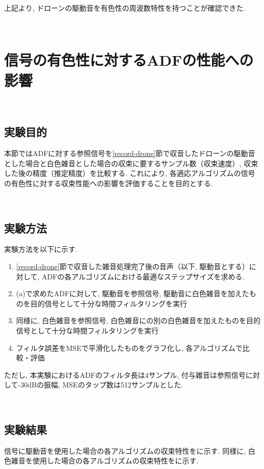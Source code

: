 上記より, ドローンの駆動音を有色性の周波数特性を持つことが確認できた. 

\
\section{信号の有色性に対するADFの性能への影響}\label{adf-color-effect}

\
\subsection{実験目的}\label{purpose-color}

本節ではADFに対する参照信号を\ref{record-drone}節で収音したドローンの駆動音とした場合と白色雑音とした場合の収束に要するサンプル数（収束速度）, 収束した後の精度（推定精度）を比較する. 
これにより, 各適応アルゴリズムの信号の有色性に対する収束性能への影響を評価することを目的とする. 

\
\subsection{実験方法}\label{instruction-color}

実験方法を以下に示す. 

\begin{enumerate}
\renewcommand{\labelenumi}{(\arabic{enumi})}
\item
  \ref{record-drone}節で収音した雑音処理完了後の音声（以下, 駆動音とする）に対して, ADFの各アルゴリズムにおける最適なステップサイズを求める. 
\item
  (a)で求めたADFに対して, 駆動音を参照信号, 駆動音に白色雑音を加えたものを目的信号として十分な時間フィルタリングを実行
\item
  同様に, 白色雑音を参照信号, 白色雑音にの別の白色雑音を加えたものを目的信号として十分な時間フィルタリングを実行
\item
  フィルタ誤差をMSEで平滑化したものをグラフ化し, 各アルゴリズムで比較・評価
\end{enumerate}

ただし, 本実験におけるADFのフィルタ長は4サンプル, 付与雑音は参照信号に対して-30dBの振幅, MSEのタップ数は512サンプルとした. 

\
\subsection{実験結果}\label{result-color}

信号に駆動音を使用した場合の各アルゴリズムの収束特性をに示す. 同様に, 白色雑音を使用した場合の各アルゴリズムの収束特性をに示す. 

